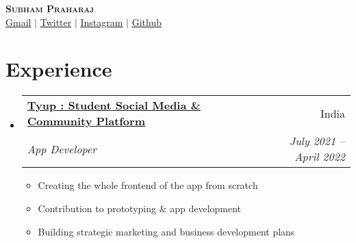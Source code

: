 \documentclass[letterpaper,11pt]{article}
\makeatletter
\newcommand{\resumeItem}[1]{
  \item\small{
    {#1 \vspace{-2pt}}
  }
}
\newcommand{\resumeSubheading}[4]{
  \vspace{-2pt}\item
    \begin{tabular*}{0.97\textwidth}[t]{l@{\extracolsep{\fill}}r}
      \textbf{#1} & #2 \\
      \textit{\small#3} & \textit{\small #4} \\
    \end{tabular*}\vspace{-7pt}
}
\newcommand{\resumeSubSubheading}[2]{
    \item
    \begin{tabular*}{0.97\textwidth}{l@{\extracolsep{\fill}}r}
      \textit{\small#1} & \textit{\small #2} \\
    \end{tabular*}\vspace{-7pt}
}
\newcommand{\resumeSubHeadingListStart}{\begin{itemize}[leftmargin=0.15in, label={}]}
\newcommand{\resumeSubHeadingListEnd}{\end{itemize}}
\newcommand{\resumeItemListStart}{\begin{itemize}}
\newcommand{\resumeItemListEnd}{\end{itemize}\vspace{-5pt}}
\makeatother
\begin{document}

\begin{center}
    \textbf{\Huge \scshape Subham Praharaj} \\ \vspace{1pt}
    \href{mailto:subhampraharaj975@gmail.com}{\underline{Gmail}} $|$ 
    \href{https://twitter.com/skpraharaj865}{\underline{Twitter}} $|$ 
    \href{https://linkedin.com/in/skpraharaj08}{\underline{Instagram}} $|$
    \href{https://github.com/skpraharaj}{\underline{Github}}
    
\end{center}


\section{Experience}
  \resumeSubHeadingListStart
    \resumeSubheading
      {\href{https://play.google.com/store/apps/details?id=org.elitecaps.tyup}{Tyup : Student Social Media \& Community Platform}}{India}
      {App Developer}{July 2021 -- April 2022}
      \resumeItemListStart
        \resumeItem{Creating the whole frontend of the app from scratch}
        \resumeItem{Contribution to prototyping \& app development}
        \resumeItem{Building strategic marketing and business development plans}
        
    
      \resumeItemListEnd
       


  \resumeSubHeadingListEnd


\end{document}
